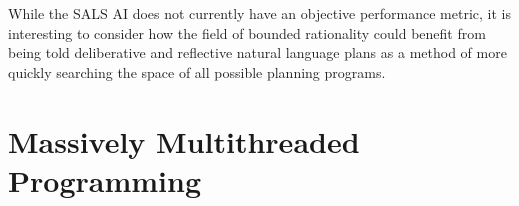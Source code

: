 While the SALS AI does not currently have an objective performance
metric, it is interesting to consider how the field of bounded
rationality could benefit from being told deliberative and reflective
natural language plans as a method of more quickly searching the space
of all possible planning programs.


\section{Massively Multithreaded Programming}

